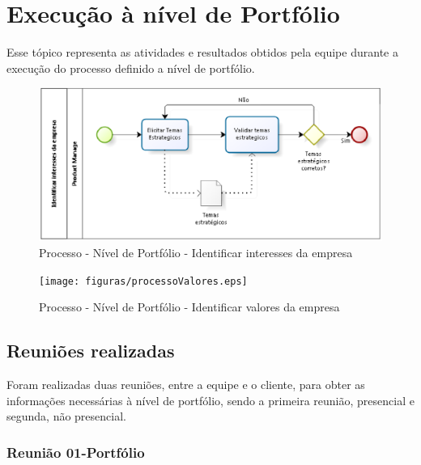 \chapter[Execução à nível de Portfólio]{Execução à nível de Portfólio}
Esse tópico representa as atividades e resultados obtidos pela equipe durante a execução do processo definido a nível de portfólio.

\begin{figure}[H]
    \centering
    \label{identificarInteresse}
    \includegraphics[keepaspectratio=true,scale=0.6]{figuras/processoInteresses.eps}
    \caption[Identificar interesses da empresa]{Processo - Nível de Portfólio - Identificar interesses da empresa}
\end{figure}

\begin{figure}[H]
    \centering
    \label{identificarInteresse}
    \texttt{[image: figuras/processoValores.eps]}
    \caption[Identificar valores da empresa]{Processo - Nível de Portfólio - Identificar valores da empresa}
\end{figure}

\section{Reuniões realizadas}
Foram realizadas duas reuniões, entre a equipe e o cliente, para obter as informações necessárias à nível de portfólio, sendo a primeira reunião, presencial e segunda, não presencial.
\subsection{Reunião 01-Portfólio}\label{Reunião01-Portfólio}


